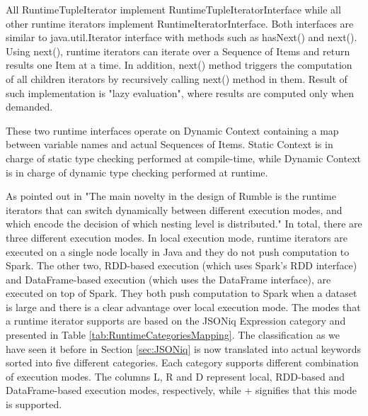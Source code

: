 All RuntimeTupleIterator implement RuntimeTupleIteratorInterface while all other runtime iterators implement RuntimeIteratorInterface. Both interfaces are similar to java.util.Iterator interface with methods such as hasNext() and next(). Using next(), runtime iterators can iterate over a Sequence of Items and return results one Item at a time. In addition, next() method triggers the computation of all children iterators by recursively calling next() method in them. Result of such implementation is "lazy evaluation", where results are computed only when demanded. 

These two runtime interfaces operate on Dynamic Context containing a map between variable names and actual Sequences of Items. Static Context is in charge of static type checking performed at compile-time, while Dynamic Context is in charge of dynamic type checking performed at runtime.

As pointed out in \cite{RumblePaper} "The main novelty in the design of Rumble is the runtime iterators that can switch dynamically between different execution modes, and which encode the decision of which nesting level is distributed." In total, there are three different execution modes. In local execution mode, runtime iterators are executed on a single node locally in Java and they do not push computation to Spark. The other two, RDD-based execution (which uses Spark’s RDD interface) and  DataFrame-based execution (which uses the DataFrame interface), are executed on top of Spark. They both push computation to Spark when a dataset is large and there is a clear advantage over local execution mode. The modes that a runtime iterator supports are based on the JSONiq Expression category and presented in Table \ref{tab:RuntimeCategoriesMapping}. The classification as we have seen it before in Section \ref{sec:JSONiq} is now translated into actual keywords sorted into five different categories. Each category supports different combination of execution modes. The columns L, R and D represent local, RDD-based and DataFrame-based execution modes, respectively, while + signifies that this mode is supported.

